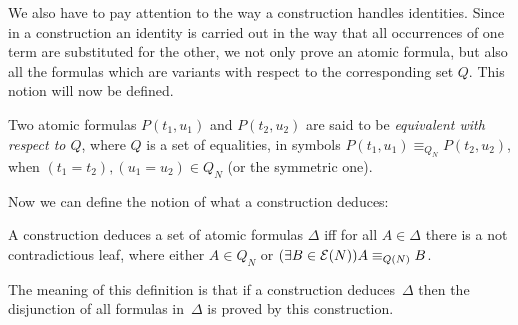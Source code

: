 We also have to pay attention to the way a construction handles
identities. Since in a construction an identity is carried out in the
way that all occurrences of one term are substituted for the other, we
not only prove an atomic formula, but also all the formulas which are
variants with respect to the corresponding set $Q$. This notion will
now be defined.

\begin{definition} Two atomic formulas $P(t_1,u_1)$ and $P(t_2,u_2)$
are said to be \emph{equivalent with respect to $Q$}, where $Q$ is a
set of equalities, in symbols $P(t_1,u_1)\equiv_{Q_N} P(t_2,u_2)$, when
$(t_1=t_2), (u_1=u_2) \in Q_N$ (or the symmetric one).
\end{definition}

Now we can define the notion of what a construction deduces:


\begin{definition} A construction deduces a set of atomic formulas
$\Delta$ iff for all $A\in\Delta$ there is a not contradictious leaf,
where either $A\in Q_N$ or
$(\exists B\in\cE(N))A\equiv_{Q(N)} B$.
\end{definition}

The meaning of this definition is that if a construction
deduces~$\Delta$ then the disjunction of all formulas in~$\Delta$ is
proved by this construction.





\endinput


